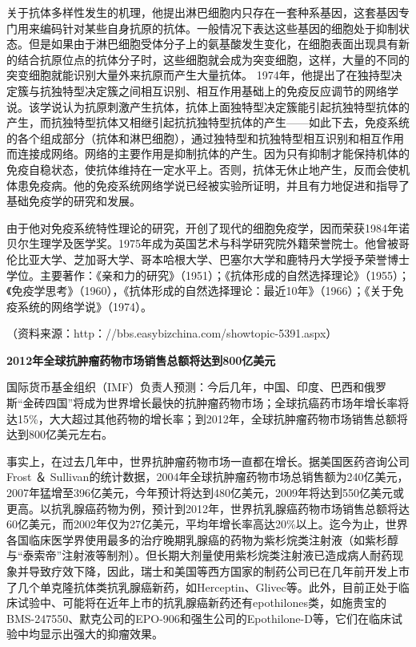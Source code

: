 关于抗体多样性发生的机理，他提出淋巴细胞内只存在一套种系基因，这套基因专门用来编码针对某些自身抗原的抗体。一般情况下表达这些基因的细胞处于抑制状态。但是如果由于淋巴细胞受体分子上的氨基酸发生变化，在细胞表面出现具有新的结合抗原位点的抗体分子时，这些细胞就会成为突变细胞，这样，大量的不同的突变细胞就能识别大量外来抗原而产生大量抗体。
1974年，他提出了在独持型决定簇与抗独特型决定簇之间相互识别、相互作用基础上的免疫反应调节的网络学说。该学说认为抗原刺激产生抗体，抗体上面独特型决定簇能引起抗独特型抗体的产生，而抗独特型抗体又相继引起抗抗独特型抗体的产生------如此下去，免疫系统的各个组成部分（抗体和淋巴细胞），通过独特型和抗独特型相互识别和相互作用而连接成网络。网络的主要作用是抑制抗体的产生。因为只有抑制才能保持机体的免疫自稳状态，使抗体维持在一定水平上。否则，抗体无休止地产生，反而会使机体患免疫病。他的免疫系统网络学说已经被实验所证明，并且有力地促进和指导了基础免疫学的研究和发展。

由于他对免疫系统特性理论的研究，开创了现代的细胞免疫学，因而荣获1984年诺贝尔生理学及医学奖。1975年成为英国艺术与科学研究院外籍荣誉院士。他曾被哥伦比亚大学、芝加哥大学、哥本哈根大学、巴塞尔大学和鹿特丹大学授予荣誉博士学位。主要著作：《亲和力的研究》（1951）；《抗体形成的自然选择理论》（1955）；《免疫学思考》（1960），《抗体形成的自然选择理论：最近10年》（1966）；《关于免疫系统的网络学说》（1974）。

（资料来源：http：//bbs.easybizchina.com/showtopic-5391.aspx）

\begin{center}
    \textbf{\Large  2012年全球抗肿瘤药物市场销售总额将达到800亿美元}
\end{center}


国际货币基金组织（IMF）负责人预测：今后几年，中国、印度、巴西和俄罗斯“金砖四国”将成为世界增长最快的抗肿瘤药物市场；全球抗癌药市场年增长率将达15\%，大大超过其他药物的增长率；到2012年，全球抗肿瘤药物市场销售总额将达到800亿美元左右。

事实上，在过去几年中，世界抗肿瘤药物市场一直都在增长。据美国医药咨询公司Frost
＆
Sullivan的统计数据，2004年全球抗肿瘤药物市场总销售额为240亿美元，2007年猛增至396亿美元，今年预计将达到480亿美元，2009年将达到550亿美元或更高。以抗乳腺癌药物为例，预计到2012年，世界抗乳腺癌药物市场销售总额将达60亿美元，而2002年仅为27亿美元，平均年增长率高达20\%以上。迄今为止，世界各国临床医学界使用最多的治疗晚期乳腺癌的药物为紫杉烷类注射液（如紫杉醇与“泰索帝”注射液等制剂）。但长期大剂量使用紫杉烷类注射液已造成病人耐药现象并导致疗效下降，因此，瑞士和美国等西方国家的制药公司已在几年前开发上市了几个单克隆抗体类抗乳腺癌新药，如Herceptin、Glivec等。此外，目前正处于临床试验中、可能将在近年上市的抗乳腺癌新药还有epothilones类，如施贵宝的BMS-247550、默克公司的EPO-906和强生公司的Epothilone-D等，它们在临床试验中均显示出强大的抑瘤效果。

